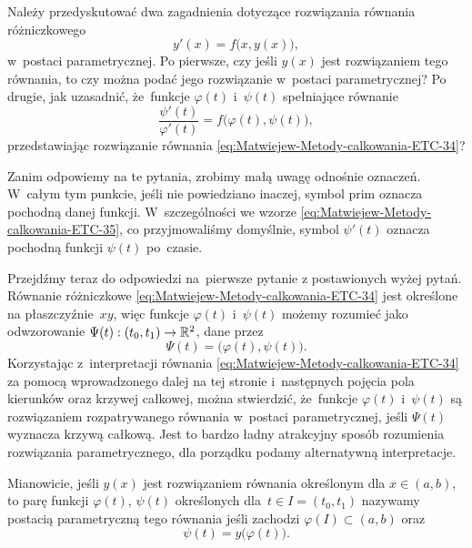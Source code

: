 \documentclass[a4paper,11pt]{article}
\numberwithin{equation}{section}
\begin{document}
\VerSpaceFour





\noindent
{} Należy przedyskutować dwa zagadnienia dotyczące rozwiązania
równania różniczkowego
\begin{equation}
  \label{eq:Uwagi-do-konkrentych-stron-15}
  y'( x ) = f\big( x, y( x ) \big),
\end{equation}
w~postaci parametrycznej. Po pierwsze, czy jeśli $y( x )$ jest rozwiązaniem
tego równania, to czy można podać jego rozwiązanie w~postaci parametrycznej?
Po drugie, jak uzasadnić, że~funkcje $\varphi( t )$ i~$\psi( t )$ spełniające
równanie
\begin{equation}
  \label{eq:Uwagi-do-konkrentych-stron-16}
  \frac{ \psi'( t ) }{ \varphi'( t ) } =
  f\big( \varphi( t ), \psi( t ) \big),
\end{equation}
przedstawiając rozwiązanie równania
\eqref{eq:Matwiejew-Metody-calkowania-ETC-34}?

Zanim odpowiemy na te pytania, zrobimy małą uwagę odnośnie oznaczeń.
W~całym tym punkcie, jeśli nie powiedziano inaczej, symbol prim oznacza
pochodną danej funkcji. W~szczególności we wzorze
\eqref{eq:Matwiejew-Metody-calkowania-ETC-35}, co przyjmowaliśmy domyślnie,
symbol $\psi'( t )$ oznacza pochodną funkcji $\psi( t )$ po~czasie.

Przejdźmy teraz do odpowiedzi na~pierwsze pytanie z postawionych wyżej
pytań. Równanie różniczkowe \eqref{eq:Matwiejew-Metody-calkowania-ETC-34}
jest określone na płaszczyźnie~$xy$, więc funkcje $\varphi( t )$ i~$\psi( t )$ możemy
rozumieć jako odwzorowanie $\Psi( t ) : ( t_{ 0 }, t_{ 1 } ) \to \mathbb{R}^{ 2 }$, dane
przez
\begin{equation}
  \label{eq:Uwagi-do-konkrentych-stron-17}
  \Psi( t ) = \big( \varphi( t ), \psi( t ) \big).
\end{equation}
Korzystając z~interpretacji równania
\eqref{eq:Matwiejew-Metody-calkowania-ETC-34} za pomocą wprowadzonego dalej
na tej stronie i~następnych pojęcia pola kierunków oraz krzywej całkowej,
można stwierdzić, że~funkcje $\varphi( t )$ i~$\psi( t )$ są rozwiązaniem
rozpatrywanego równania w~postaci parametrycznej, jeśli $\Psi( t )$ wyznacza
krzywą całkową. Jest to bardzo ładny atrakcyjny sposób rozumienia
rozwiązania parametrycznego, dla porządku podamy alternatywną interpretacje.

Mianowicie, jeśli $y( x )$ jest rozwiązaniem równania określonym dla
$x \in ( a, b )$, to parę funkcji $\varphi( t )$, $\psi( t )$ określonych
dla~$t \in I = ( t_{ 0 }, t_{ 1 } )$ nazywamy postacią parametryczną tego
równania jeśli zachodzi $\varphi( I ) \subset ( a, b )$ oraz
\begin{equation}
  \label{eq:Uwagi-do-konkrentych-stron-18}
  \psi( t ) = y\big( \varphi( t ) \big).
\end{equation}
\end{document}
